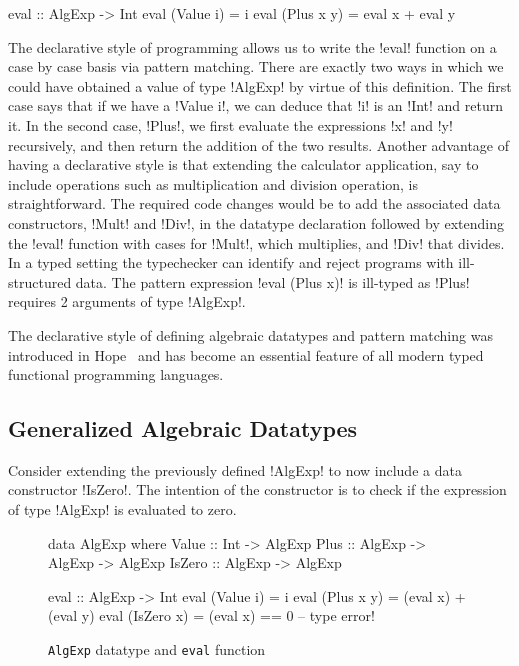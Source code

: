 \documentclass[screen,nonacm,manuscript,review]{acmart} %
\begin{document}
\begin{CenteredBox}
\begin{code}
eval :: AlgExp -> Int
eval (Value i) = i
eval (Plus x y) = eval x + eval y
\end{code}
\end{CenteredBox}

The declarative style of programming allows us to write the !eval!
function on a case by case basis via pattern
matching. There are exactly two ways in which we could have obtained a
value of type !AlgExp! by virtue of this definition. The first case says
that if we have a !Value i!, we can deduce that
!i! is an !Int! and return it. In the second case, !Plus!, we first
evaluate the expressions !x! and !y! recursively, and then return the
addition of the two results. Another advantage of having a declarative
style is that extending the calculator application, say to include
operations such as multiplication and division operation, is
straightforward. The required code changes would be to add the
associated data constructors, !Mult! and !Div!, in the datatype
declaration followed by extending the !eval! function with cases for
!Mult!, which multiplies, and !Div! that divides.
In a typed setting the typechecker can identify and reject programs
with ill-structured data. The pattern expression !eval (Plus x)! is
ill-typed as !Plus! requires 2 arguments of type !AlgExp!.

The declarative style of defining algebraic datatypes and pattern matching was introduced in
Hope~\cite{burstall_proving_1969, burstall_hope_1980} and has become an
essential feature of all modern typed functional programming languages.

\subsection{Generalized Algebraic Datatypes}
Consider extending the previously defined !AlgExp! to now
include a data constructor !IsZero!. The intention of the constructor is to
check if the expression of type !AlgExp! is evaluated to zero.

\begin{figure}[ht]
\centering
\begin{minipage}{0.5\linewidth}
\begin{CenteredBox}
\begin{code}
data AlgExp where
  Value  :: Int              -> AlgExp
  Plus   :: AlgExp -> AlgExp -> AlgExp
  IsZero :: AlgExp           -> AlgExp
\end{code}
\end{CenteredBox}
\end{minipage}%
\begin{minipage}{0.5\linewidth}
\begin{CenteredBox}
\begin{code}
eval :: AlgExp -> Int
eval (Value i) = i
eval (Plus x y) = (eval x) + (eval y)
eval (IsZero x) = (eval x) == 0 -- type error!
\end{code}
\end{CenteredBox}
\end{minipage}
\caption{\texttt{AlgExp} datatype and \texttt{eval} function}
\label{fig:algexp-eval}
\end{figure}
\end{document}

